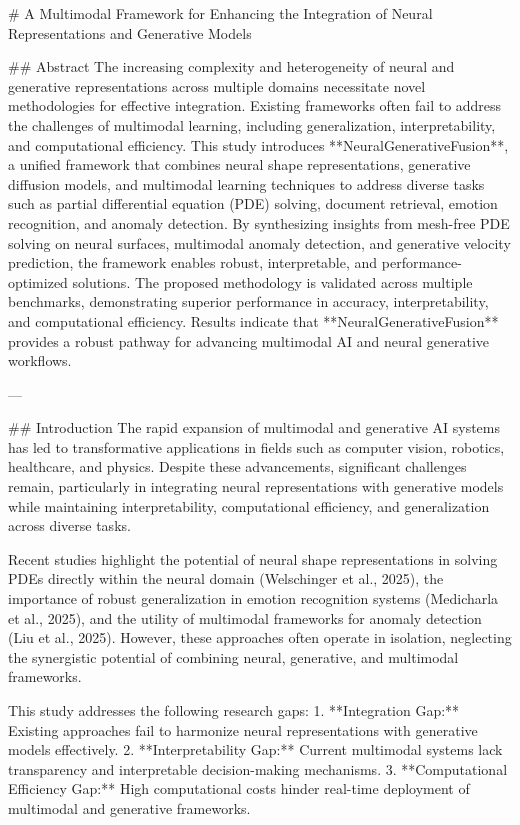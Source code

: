 # A Multimodal Framework for Enhancing the Integration of Neural Representations and Generative Models

## Abstract
The increasing complexity and heterogeneity of neural and generative representations across multiple domains necessitate novel methodologies for effective integration. Existing frameworks often fail to address the challenges of multimodal learning, including generalization, interpretability, and computational efficiency. This study introduces **NeuralGenerativeFusion**, a unified framework that combines neural shape representations, generative diffusion models, and multimodal learning techniques to address diverse tasks such as partial differential equation (PDE) solving, document retrieval, emotion recognition, and anomaly detection. By synthesizing insights from mesh-free PDE solving on neural surfaces, multimodal anomaly detection, and generative velocity prediction, the framework enables robust, interpretable, and performance-optimized solutions. The proposed methodology is validated across multiple benchmarks, demonstrating superior performance in accuracy, interpretability, and computational efficiency. Results indicate that **NeuralGenerativeFusion** provides a robust pathway for advancing multimodal AI and neural generative workflows.

---

## Introduction
The rapid expansion of multimodal and generative AI systems has led to transformative applications in fields such as computer vision, robotics, healthcare, and physics. Despite these advancements, significant challenges remain, particularly in integrating neural representations with generative models while maintaining interpretability, computational efficiency, and generalization across diverse tasks.

Recent studies highlight the potential of neural shape representations in solving PDEs directly within the neural domain (Welschinger et al., 2025), the importance of robust generalization in emotion recognition systems (Medicharla et al., 2025), and the utility of multimodal frameworks for anomaly detection (Liu et al., 2025). However, these approaches often operate in isolation, neglecting the synergistic potential of combining neural, generative, and multimodal frameworks.

This study addresses the following research gaps:
1. **Integration Gap:** Existing approaches fail to harmonize neural representations with generative models effectively.
2. **Interpretability Gap:** Current multimodal systems lack transparency and interpretable decision-making mechanisms.
3. **Computational Efficiency Gap:** High computational costs hinder real-time deployment of multimodal and generative frameworks.


